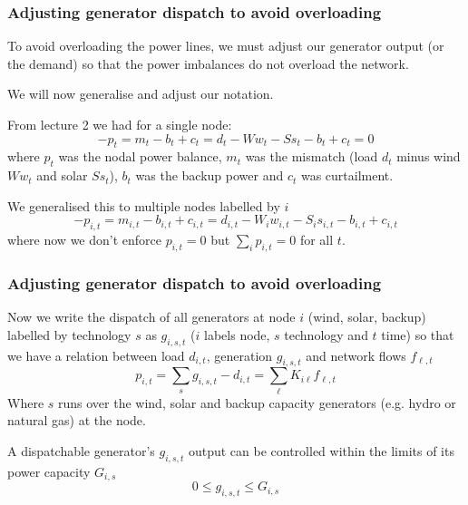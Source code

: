 \documentclass[10pt,dvipsnames]{beamer}
\begin{document}
\begin{frame}
  \frametitle{Adjusting generator dispatch to avoid overloading}

  To avoid overloading the power lines, we must adjust our generator
  output (or the demand) so that the power imbalances do not overload
  the network.

  We will now generalise and adjust our notation.

  From lecture 2 we had for a single node:
  \begin{equation*}
    - p_t = m_t -b_t + c_t = d_t - Ww_t - Ss_t -b_t + c_t = 0
  \end{equation*}
  where $p_t$ was the nodal power balance, $m_t$ was the mismatch
  (load $d_t$ minus wind $Ww_t$ and solar $Ss_t$), $b_t$ was the
  backup power and $c_t$ was curtailment.

  We generalised this to multiple nodes labelled by $i$
  \begin{equation*}
    - p_{i,t} = m_{i,t} -b_{i,t} + c_{i,t} = d_{i,t} - W_iw_{i,t} - S_is_{i,t} -b_{i,t} + c_{i,t}
  \end{equation*}
  where now we don't enforce $p_{i,t} = 0$ but $\sum_{i} p_{i,t} = 0$ for
  all $t$.

\end{frame}


\begin{frame}
  \frametitle{Adjusting generator dispatch to avoid overloading} Now
  we write the dispatch of all generators at node $i$ (wind, solar,
  backup) labelled by technology $s$ as $g_{i,s,t}$ ($i$ labels node, $s$ technology and $t$ time) so that we have a relation between load $d_{i,t}$, generation $g_{i,s,t}$ and network flows $f_{\ell,t}$
  \begin{equation*}
    p_{i,t} = \sum_{s} g_{i,s,t} - d_{i,t} = \sum_{\ell} K_{i\ell} f_{\ell,t}
  \end{equation*}
  Where $s$ runs over the wind, solar and backup capacity generators
  (e.g. hydro or natural gas) at the node.

  A dispatchable generator's $g_{i,s,t}$ output can be controlled
  within the limits of its power capacity $G_{i,s}$
  \begin{equation*}
      0 \leq g_{i,s,t} \leq  G_{i,s}
  \end{equation*}
\end{frame}
\end{document}
